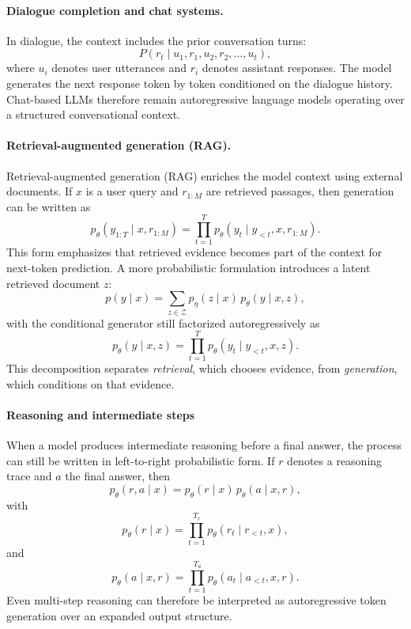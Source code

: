 \documentclass{article}
\begin{document}
\paragraph{Dialogue completion and chat systems.}
In dialogue, the context includes the prior conversation turns:
\[
P(r_t \mid u_1, r_1, u_2, r_2, \dots, u_t),
\]
where $u_i$ denotes user utterances and $r_i$ denotes assistant responses. The model generates the next response token by token conditioned on the dialogue history. Chat-based LLMs therefore remain autoregressive language models operating over a structured conversational context.

\paragraph{Retrieval-augmented generation (RAG).}
Retrieval-augmented generation (RAG) enriches the model context using external documents. If $x$ is a user query and $r_{1:M}$ are retrieved passages, then generation can be written as
\begin{equation}
    p_\theta(y_{1:T}\mid x,r_{1:M})=\prod_{t=1}^{T} p_\theta(y_t\mid y_{<t},x,r_{1:M}).
\end{equation}
This form emphasizes that retrieved evidence becomes part of the context for next-token prediction. A more probabilistic formulation introduces a latent retrieved document $z$:
\begin{equation}
    p(y\mid x)=\sum_{z\in\mathcal{Z}} p_\eta(z\mid x)\,p_\theta(y\mid x,z),
\end{equation}
with the conditional generator still factorized autoregressively as
\begin{equation}
    p_\theta(y\mid x,z)=\prod_{t=1}^{T} p_\theta(y_t\mid y_{<t},x,z).
\end{equation}
This decomposition separates \emph{retrieval}, which chooses evidence, from \emph{generation}, which conditions on that evidence.

\paragraph{Reasoning and intermediate steps}
When a model produces intermediate reasoning before a final answer, the process can still be written in left-to-right probabilistic form. If $r$ denotes a reasoning trace and $a$ the final answer, then
\begin{equation}
    p_\theta(r,a\mid x)=p_\theta(r\mid x)\,p_\theta(a\mid x,r),
\end{equation}
with
\begin{equation}
    p_\theta(r\mid x)=\prod_{t=1}^{T_r} p_\theta(r_t\mid r_{<t},x),
\end{equation}
and
\begin{equation}
    p_\theta(a\mid x,r)=\prod_{t=1}^{T_a} p_\theta(a_t\mid a_{<t},x,r).
\end{equation}
Even multi-step reasoning can therefore be interpreted as autoregressive token generation over an expanded output structure.
\end{document}
